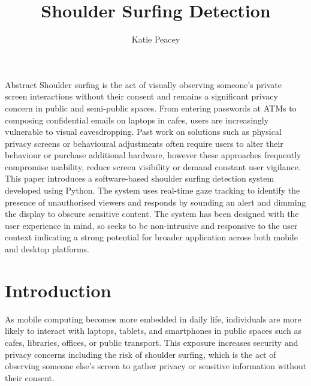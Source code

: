 \documentclass[12pt]{article}
\title{ Shoulder Surfing Detection}
\author{Katie Peacey}
\theoremstyle{plain}
\theoremstyle{definition}
\begin{document}

\maketitle
\studentdeclarations

\begin{frontmatterparagraph}{Abstract}
Shoulder surfing is the act of visually observing someone’s private screen interactions without their consent and remains a significant privacy concern in public and semi-public spaces. From entering passwords at ATMs to composing confidential emails on laptops in cafes, users are increasingly vulnerable to visual eavesdropping. Past work on solutions such as physical privacy screens or behavioural adjustments often require users to alter their behaviour or purchase additional hardware, however these approaches frequently compromise usability, reduce screen visibility or demand constant user vigilance. This paper introduces a software-based shoulder surfing detection system developed using Python. The system uses real-time gaze tracking to identify the presence of unauthorised viewers and responds by sounding an alert and dimming the display to obscure sensitive content. The system has been designed  with the user experience in mind, so seeks to be non-intrusive and responsive to the user context indicating a strong potential for broader application across both mobile and desktop platforms.
\end{frontmatterparagraph}

\tableofcontents

\listoffigures
\listoftables
\clearpage


\section{Introduction}
\label{sec:intro}

As mobile computing becomes more embedded in daily life, individuals are more likely to interact with laptops, tablets, and smartphones in public spaces such as cafes, libraries, offices, or public transport. This exposure increases security and privacy concerns including the risk of shoulder surfing, which is the act of observing someone else’s screen to gather privacy or sensitive information without their consent.
\end{document}
